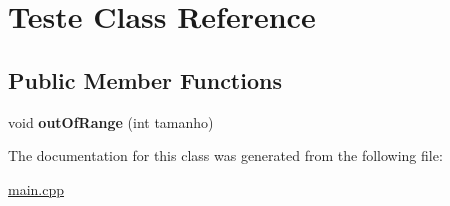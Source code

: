 \hypertarget{class_teste}{}\section{Teste Class Reference}
\label{class_teste}
\subsection*{Public Member Functions}
\begin{DoxyCompactItemize}
\item 
\mbox{\label{class_teste_af54a55d6128b667b78967b425d4d30ab}} 
void {\bfseries out\+Of\+Range} (int tamanho)
\end{DoxyCompactItemize}


The documentation for this class was generated from the following file\+:\begin{DoxyCompactItemize}
\item 
\mbox{\hyperlink{main_8cpp}{main.\+cpp}}\end{DoxyCompactItemize}
